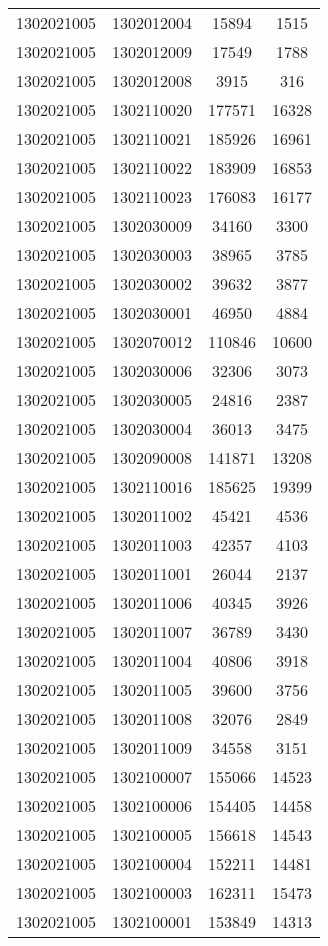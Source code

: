 \begin{longtable}[h]{llcc}
		1302021005 & 1302012004 & 15894 & 1515\\
		1302021005 & 1302012009 & 17549 & 1788\\
		1302021005 & 1302012008 & 3915 & 316\\
		1302021005 & 1302110020 & 177571 & 16328\\
		1302021005 & 1302110021 & 185926 & 16961\\
		1302021005 & 1302110022 & 183909 & 16853\\
		1302021005 & 1302110023 & 176083 & 16177\\
		1302021005 & 1302030009 & 34160 & 3300\\
		1302021005 & 1302030003 & 38965 & 3785\\
		1302021005 & 1302030002 & 39632 & 3877\\
		1302021005 & 1302030001 & 46950 & 4884\\
		1302021005 & 1302070012 & 110846 & 10600\\
		1302021005 & 1302030006 & 32306 & 3073\\
		1302021005 & 1302030005 & 24816 & 2387\\
		1302021005 & 1302030004 & 36013 & 3475\\
		1302021005 & 1302090008 & 141871 & 13208\\
		1302021005 & 1302110016 & 185625 & 19399\\
		1302021005 & 1302011002 & 45421 & 4536\\
		1302021005 & 1302011003 & 42357 & 4103\\
		1302021005 & 1302011001 & 26044 & 2137\\
		1302021005 & 1302011006 & 40345 & 3926\\
		1302021005 & 1302011007 & 36789 & 3430\\
		1302021005 & 1302011004 & 40806 & 3918\\
		1302021005 & 1302011005 & 39600 & 3756\\
		1302021005 & 1302011008 & 32076 & 2849\\
		1302021005 & 1302011009 & 34558 & 3151\\
		1302021005 & 1302100007 & 155066 & 14523\\
		1302021005 & 1302100006 & 154405 & 14458\\
		1302021005 & 1302100005 & 156618 & 14543\\
		1302021005 & 1302100004 & 152211 & 14481\\
		1302021005 & 1302100003 & 162311 & 15473\\
		1302021005 & 1302100001 & 153849 & 14313\\

\end{longtable}
